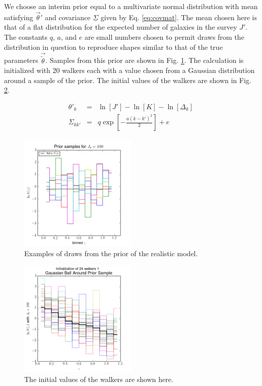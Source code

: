 \documentclass[preprint]{aastex}
\newcommand{\textul}{\underline}
\begin{document}
We choose an interim prior equal to a multivariate normal distribution with mean satisfying $\vec{\theta}'$ and covariance $\textul{\Sigma}$ given by Eq. \ref{eq:covmat}.  The mean chosen here is that of a flat distribution for the expected number of galaxies in the survey $J'$.  The constants $q$, $a$, and $e$ are small numbers chosen to permit draws from the distribution in question to reproduce shapes similar to that of the true parameters $\vec{\tilde{\theta}}$.  Samples from this prior are shown in Fig. \ref{fig:realprior}.  The calculation is initialized with $20$ walkers each with a value chosen from a Gaussian distribution around a sample of the prior.  The initial values of the walkers are shown in Fig. \ref{fig:realival}.

\begin{eqnarray}
\label{eq:covmat}
\theta'_{k} &=& \ln[J']-\ln[K]-\ln[\Delta_{k}]\\
\Sigma_{kk'} &=& q\exp\left[-\frac{a(k-k')^{2}}{2}\right]+e
\end{eqnarray}

\begin{figure}
\includegraphics[width=0.5\textwidth]{real/priorsamps.png}
\caption{Examples of draws from the prior of the realistic model.}
\label{fig:realprior}
\end{figure}

\begin{figure}
\includegraphics[width=0.5\textwidth]{real/initializations.png}
\caption{The initial values of the walkers are shown here.}
\label{fig:realival}
\end{figure}
\end{document}
